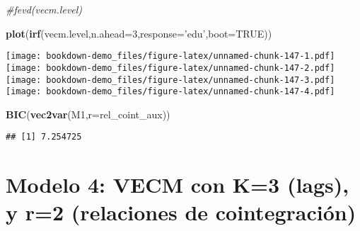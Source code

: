 \documentclass[]{book}
\newenvironment{Shaded}{\begin{snugshade}}{\end{snugshade}}
\newcommand{\KeywordTok}[1]{\textcolor[rgb]{0.13,0.29,0.53}{\textbf{#1}}}
\newcommand{\DataTypeTok}[1]{\textcolor[rgb]{0.13,0.29,0.53}{#1}}
\newcommand{\DecValTok}[1]{\textcolor[rgb]{0.00,0.00,0.81}{#1}}
\newcommand{\StringTok}[1]{\textcolor[rgb]{0.31,0.60,0.02}{#1}}
\newcommand{\CommentTok}[1]{\textcolor[rgb]{0.56,0.35,0.01}{\textit{#1}}}
\newcommand{\OtherTok}[1]{\textcolor[rgb]{0.56,0.35,0.01}{#1}}
\newcommand{\OperatorTok}[1]{\textcolor[rgb]{0.81,0.36,0.00}{\textbf{#1}}}
\newcommand{\NormalTok}[1]{#1}
\theoremstyle{definition}
\theoremstyle{definition}
\theoremstyle{definition}
\theoremstyle{remark}
\begin{document}
\begin{Shaded}
\begin{Highlighting}[]
\CommentTok{#fevd(vecm.level)}
\end{Highlighting}
\end{Shaded}

\begin{Shaded}
\begin{Highlighting}[]
\KeywordTok{plot}\NormalTok{(}\KeywordTok{irf}\NormalTok{(vecm.level,}\DataTypeTok{n.ahead=}\DecValTok{3}\NormalTok{,}\DataTypeTok{response=}\StringTok{'edu'}\NormalTok{,}\DataTypeTok{boot=}\OtherTok{TRUE}\NormalTok{))}
\end{Highlighting}
\end{Shaded}

\texttt{[image: bookdown-demo\_files/figure-latex/unnamed-chunk-147-1.pdf]}
\texttt{[image: bookdown-demo\_files/figure-latex/unnamed-chunk-147-2.pdf]}
\texttt{[image: bookdown-demo\_files/figure-latex/unnamed-chunk-147-3.pdf]}
\texttt{[image: bookdown-demo\_files/figure-latex/unnamed-chunk-147-4.pdf]}

\begin{Shaded}
\begin{Highlighting}[]
\KeywordTok{BIC}\NormalTok{(}\KeywordTok{vec2var}\NormalTok{(M1,}\DataTypeTok{r=}\NormalTok{rel_coint_aux))}
\end{Highlighting}
\end{Shaded}

\begin{verbatim}
## [1] 7.254725
\end{verbatim}

\section{Modelo 4: VECM con K=3 (lags), y r=2 (relaciones de
cointegración)}\label{modelo-4-vecm-con-k3-lags-y-r2-relaciones-de-cointegracion}

\begin{Shaded}
\end{Shaded}
\end{document}
